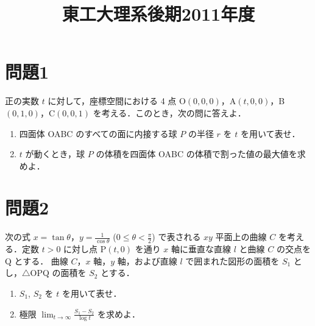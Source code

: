 \documentclass[unicode,12pt, a4paper]{ltjsarticle}%
\title{東工大理系後期2011年度}
\begin{document}
\maketitle
\section{問題1}
正の実数 $t$ に対して，座標空間における 4 点 O$(0,0,0)$，A$(t,0,0)$，B$(0,1,0)$，C$(0,0,1)$ を考える．このとき，次の問に答えよ．
\begin{enumerate}
    \item 四面体 OABC のすべての面に内接する球 $P$ の半径 $r$ を $t$ を用いて表せ．
    \item $t$ が動くとき，球 $P$ の体積を四面体 OABC の体積で割った値の最大値を求めよ．
\end{enumerate}


\section{問題2}
次の式 $x = \tan\theta$，$y = \frac{1}{\cos\theta}$ ($0 \le \theta < \frac{\pi}{2}$) で表される $xy$ 平面上の曲線 $C$ を考え
る．定数 $t>0$ に対し点 P$(t,0)$ を通り $x$ 軸に垂直な直線 $l$ と曲線 $C$ の交点を Q とする．
曲線 $C$，$x$ 軸，$y$ 軸，および直線 $l$ で囲まれた図形の面積を $S_1$ とし，$\triangle$OPQ の面積を $S_2$ とする．
\begin{enumerate}
    \item $S_1$, $S_2$ を $t$ を用いて表せ．
    \item 極限 $\displaystyle\lim_{t \to \infty} \frac{S_1 - S_2}{\log t}$ を求めよ．
\end{enumerate}
\end{document}
